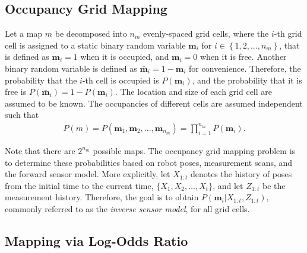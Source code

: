 \documentclass[letterpaper, 10pt, conference]{ieeeconf}
\newcommand{\braces}[1]{\ensuremath{\left\{ #1 \right\}}}
\begin{document}
	
\subsection{Occupancy Grid Mapping}

Let a map $m$ be decomposed into $n_m$ evenly-spaced grid cells, where the $i$-th grid cell is assigned to a static binary random variable $\mathbf{m}_i$ for $i\in\braces{1,2,...,n_m}$, that is defined as $\mathbf{m}_i=1$ when it is occupied, and $\mathbf{m}_i=0$ when it is free. Another binary random variable is defined as $\bar{\mathbf{m}}_i=1-\mathbf{m}_i$ for convenience.
Therefore, the probability that the $i$-th cell is occupied is $P(\mathbf{m}_i)$, and the probability that it is free is $P(\bar{\mathbf{m}}_i)=1-P(\mathbf{m}_i)$. The location and size of each grid cell are assumed to be known.
The occupancies of different cells are assumed independent such that
\begin{align}
P(m)=P(\mathbf{m}_1,\mathbf{m}_2,...,\mathbf{m}_{n_m})=\prod_{i=1}^{n_m}P(\mathbf{m}_i).
\end{align}

Note that there are $2^{n_{m}}$ possible maps. The occupancy grid mapping problem is to determine these probabilities based on robot poses, measurement scans, and the forward sensor model. More explicitly, let $X_{1:t}$ denotes the history of poses from the initial time to the current time, $\{X_1,X_2,\ldots, X_t\}$, and let $Z_{1:t}$ be the measurement history. Therefore, the goal is to obtain $P(\mathbf{m}_i|X_{1:t},Z_{1:t})$, commonly referred to as the \emph{inverse sensor model}, for all grid cells.

	
\subsection{Mapping via Log-Odds Ratio}
\end{document}
